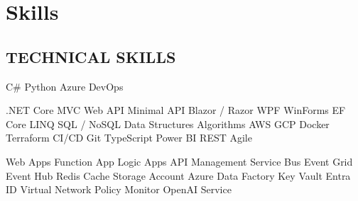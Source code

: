 \documentclass[]{deedy-resume-openfont}
\begin{document}
%
%



%
%

\begin{minipage}[t]{0.33\textwidth} 


\section{Skills}
\subsection{TECHNICAL SKILLS}
\textbullet{} C\# 
\textbullet{} Python 
\textbullet{} Azure 
\textbullet{} DevOps  \\
\vskip 0.1in

\textbullet{} .NET Core  
\textbullet{} MVC  
\textbullet{} Web API
\textbullet{} Minimal API  
\textbullet{} Blazor / Razor  
\textbullet{} WPF
\textbullet{} WinForms
\textbullet{} EF Core  
\textbullet{} LINQ
\textbullet{} SQL / NoSQL  
\textbullet{} Data Structures  
\textbullet{} Algorithms  
\textbullet{} AWS  
\textbullet{} GCP  
\textbullet{} Docker  
\textbullet{} Terraform  
\textbullet{} CI/CD  
\textbullet{} Git  
\textbullet{} TypeScript  
\textbullet{} Power BI 
\textbullet{} REST
\textbullet{} Agile  


\vskip 0.1in

\textbullet{} Web Apps  
\textbullet{} Function App  
\textbullet{} Logic Apps  
\textbullet{} API Management  
\textbullet{} Service Bus  
\textbullet{} Event Grid  
\textbullet{} Event Hub  
\textbullet{} Redis Cache  
\textbullet{} Storage Account  
\textbullet{} Azure Data Factory  
\textbullet{} Key Vault  
\textbullet{} Entra ID  
\textbullet{} Virtual Network
\textbullet{} Policy  
\textbullet{} Monitor  
\textbullet{} OpenAI Service  


\end{minipage}
\end{document}
